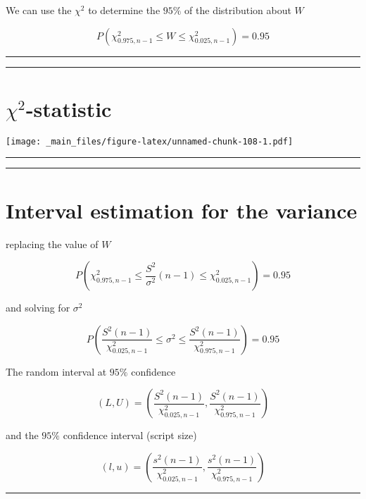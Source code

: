 \documentclass[
]{book}
\begin{document}
We can use the \(\chi^2\) to determine the \(95\%\) of the distribution about \(W\)

\[P(\chi^2_{0.975,n-1} \leq W \leq \chi^2_{0.025,n-1})=0.95\]

\begin{center}\rule{0.5\linewidth}{0.5pt}\end{center}

\begin{center}\rule{0.5\linewidth}{0.5pt}\end{center}

\hypertarget{chi2-statistic-2}{%
\section{\texorpdfstring{\(\chi^2\)-statistic}{\textbackslash chi\^{}2-statistic}}\label{chi2-statistic-2}}

\texttt{[image: \_main\_files/figure-latex/unnamed-chunk-108-1.pdf]}

\begin{center}\rule{0.5\linewidth}{0.5pt}\end{center}

\begin{center}\rule{0.5\linewidth}{0.5pt}\end{center}

\hypertarget{interval-estimation-for-the-variance-2}{%
\section{Interval estimation for the variance}\label{interval-estimation-for-the-variance-2}}

replacing the value of \(W\)

\[P(\chi^2_{0.975,n-1} \leq \frac{S^2}{\sigma^2}(n-1) \leq \chi^2_{0.025,n-1})=0.95\]

and solving for \(\sigma^2\)

\[P(\frac{S^2 (n-1)}{\chi^2_{0.025,n-1}}\leq \sigma^2 \leq \frac{S^2(n-1)}{\chi^2_{0.975,n-1}})=0.95\]

The random interval at \(95\%\) confidence

\[(L,U) = (\frac{S^2 (n-1)}{\chi^2_{0.025,n-1}},\frac{S^2(n-1)}{\chi^2_{0.975,n-1}})\]

and the \(95\%\) confidence interval (script size)

\[(l,u) = (\frac{s^2 (n-1)}{\chi^2_{0.025,n-1}},\frac{s^2(n-1)}{\chi^2_{0.975,n-1}})\]

\begin{center}\rule{0.5\linewidth}{0.5pt}\end{center}
\end{document}
